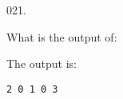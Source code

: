 \documentclass[]{book}
\newenvironment{Shaded}{}{}
\newcommand{\BuiltInTok}[1]{#1}
\newcommand{\DecValTok}[1]{\textcolor[rgb]{0.25,0.63,0.44}{#1}}
\newcommand{\NormalTok}[1]{#1}
\newcommand{\StringTok}[1]{\textcolor[rgb]{0.25,0.44,0.63}{#1}}
\begin{document}
\vspace{2mm}\noindent\hrulefill{}

\begin{minipage}{\linewidth}\noindent
{\tiny 021.}\\
\begin{minipage}[t]{.485\linewidth}

What is the output of:

\begin{framed}

\begin{Shaded}
\end{Shaded}

\end{framed}

\end{minipage}
\hfill
\begin{minipage}[t]{.485\linewidth}

The output is:

\begin{framed}

\begin{verbatim}
2 0 1 0 3 
\end{verbatim}

\end{framed}

\end{minipage}
\end{minipage}

\vspace{2mm}\noindent\hrulefill{}
\end{document}
